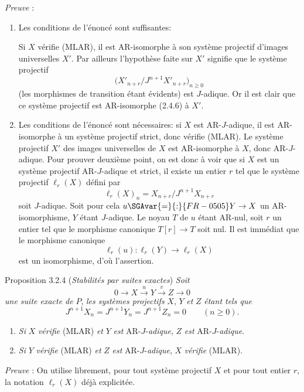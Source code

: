 \emph{Preuve} :
\begin{enumerate}[label=(\alph*)]
\item Les conditions de l'énoncé sont suffisantes:

Si $X$ vérifie (MLAR), il est AR-isomorphe à son système projectif d'images universelles $X'$. Par ailleurs l'hypothèse faite sur $X'$ signifie que le système projectif
\[
\bigl(X'_{n+r}/J^{n+1}X'_{n+r}\bigr)_{n\ge0}
\]
(les morphismes de transition étant évidents) est $J$-adique. Or il est clair que ce système projectif est AR-isomorphe (2.4.6) à $X'$.
\item Les conditions de l'énoncé sont nécessaires: si $X$ est AR-$J$-adique, il est AR-isomorphe à un système projectif strict, donc vérifie (MLAR). 
Le
système projectif $X'$ des images universelles de $X$ est AR-isomorphe à $X$, donc AR-$J$-adique. Pour prouver  deuxième point, on est donc  à voir que si $X$ est un système projectif AR-$J$-adique et strict, il existe un entier $r$ tel que le système projectif $\ell_r(X)$ défini par
\[
\ell_r(X)_n=X_{n+r}/J^{n+1}X_{n+r}
\]
soit $J$-adique. Soit pour cela $u\SGAvar{=}{:}{FR-0505}Y\to X$ un AR-isomorphisme, $Y$ étant $J$-adique. Le noyau $T$ de $u$ étant AR-nul, soit $r$ un entier tel que le morphisme canonique $T[r]\to T$ soit nul. Il est immédiat que le morphisme canonique
\[
\ell_r(u):\ell_r(Y)\longrightarrow\ell_r(X)
\]
est un isomorphisme, d'où l'assertion.
\end{enumerate}

\begin{statement}{Proposition 3.2.4 (\emph{Stabilités par suites exactes})}
\emph{Soit}
\[
0\longrightarrow X\stackrel{u}{\longrightarrow}Y\stackrel{v}{\longrightarrow}Z\longrightarrow0
\]
\emph{une suite exacte de} $P$, \emph{les systèmes projectifs} $X$, $Y$ \emph{et} $Z$ \emph{étant tels que}
\[
J^{n+1}X_n=J^{n+1}Y_n=J^{n+1}Z_n=0\qquad(n\ge0).
\]
\begin{enumerate}[label=(\roman*)]
\item \emph{Si} $X$ \emph{vérifie} (MLAR) \emph{et} $Y$ \emph{est} AR-$J$-\emph{adique}, $Z$ \emph{est} AR-$J$-\emph{adique}.
\item \emph{Si} $Y$ \emph{vérifie} (MLAR) \emph{et} $Z$ \emph{est} AR-$J$-\emph{adique}, $X$ \emph{vérifie} (MLAR).
\end{enumerate}
\end{statement}

\emph{Preuve} : On utilise librement, pour tout système projectif $X$ et pour tout entier $r$, la notation $\ell_r(X)$ déjà explicitée.

